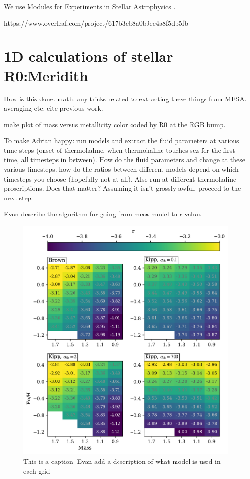 We use Modules for Experiments in Stellar Astrophysics
\citep[MESA][]{Paxton2011, Paxton2013, Paxton2015, Paxton2018, Paxton2019}.

https://www.overleaf.com/project/617b3cb8a0b9ee4a8f5db5fb
\section{1D calculations of stellar R0:Meridith}\label{sec:1D}
How is this done. math. any tricks related to extracting these things from MESA. averaging etc. cite previous work.

make plot of mass versus metallicity color coded by R0 at the RGB bump.


To make Adrian happy: run models and extract the fluid parameters at various time steps (onset of thermohaline, when thermohaline touches scz for the first time, all timesteps in between). How do the fluid parameters and change at these various timesteps. how do the ratios between different models depend on which timesteps you choose (hopefully not at all). Also run at different thermohaline proscriptions. Does that matter? Assuming it isn't grossly awful, proceed to the next step.

{\color{red} Evan describe the algorithm for going from mesa model to r value}.

\begin{figure}
    \centering
    \includegraphics[width=\textwidth]{figures/mesa_spread/mesa_r_spread.pdf}
    \caption{This is a caption. {\color{red} Evan add a description of what model is used in each grid}}
    \label{fig:mesa_r_spread}
\end{figure}
